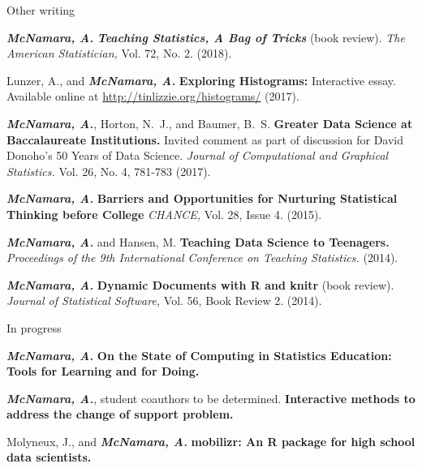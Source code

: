 \documentclass{resume} %
\begin{document}
\begin{rSection}{Other writing}

{\bf \em McNamara, A.} {\bf \em Teaching Statistics, A Bag of Tricks} (book review). {\em The American Statistician,} Vol. 72, No. 2. (2018). 

 
Lunzer, A., and {\bf \em McNamara, A.} {\bf Exploring Histograms:} Interactive essay. Available online at \url{http://tinlizzie.org/histograms/} (2017).

{\bf \em McNamara, A.}, Horton, N.~J., and Baumer, B.~S. {\bf Greater Data Science at Baccalaureate Institutions.} Invited comment as part of discussion for David Donoho's 50 Years of Data Science. {\em Journal of Computational and Graphical Statistics.} Vol. 26, No. 4, 781-783 (2017). 

{\bf \em McNamara, A.} {\bf Barriers and Opportunities for Nurturing Statistical Thinking before College}{ \em CHANCE,} Vol. 28, Issue 4. (2015).

{\bf \em McNamara, A. }and Hansen, M. {\bf Teaching Data Science to Teenagers.}{ \em Proceedings of the 9th International Conference on Teaching Statistics.} (2014). 

{\bf \em McNamara, A. }{\bf Dynamic Documents with R and knitr} (book review). {\em Journal of Statistical Software,}{ Vol. 56, Book Review 2.} (2014).
\end{rSection}


\begin{rSection}{In progress}

{\bf \em{McNamara, A.}} {\bf On the State of Computing in Statistics Education: Tools for Learning and for Doing. } 

{\bf \em{McNamara, A.}}, student coauthors to be determined. {\bf Interactive methods to address the change of support problem. } 

Molyneux, J., and {\bf \em McNamara, A.} {\bf mobilizr: An R package for high school data scientists.}

\end{rSection}


\end{document}
